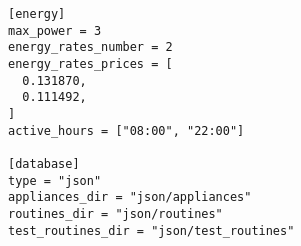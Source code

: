 \begin{lstlisting}[language=numbered,caption={Example of the configuration file used during development},label=code:config,float,floatplacement=H]
[energy]
max_power = 3
energy_rates_number = 2
energy_rates_prices = [
  0.131870,
  0.111492,
]
active_hours = ["08:00", "22:00"]

[database]
type = "json"
appliances_dir = "json/appliances"
routines_dir = "json/routines"
test_routines_dir = "json/test_routines"
\end{lstlisting}